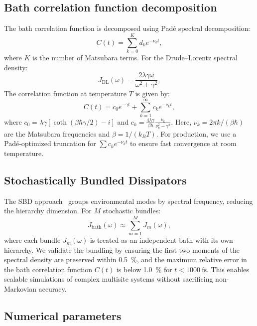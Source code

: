 \documentclass[11pt,a4paper]{article}
\begin{document}
\subsection{Bath correlation function decomposition}

The bath correlation function is decomposed using Padé spectral decomposition:
\begin{equation}
C(t) = \sum_{k=0}^{K} d_k e^{-\nu_k t},
\label{eq:SI_bath_correlation}
\end{equation}
where $K$ is the number of Matsubara terms. For the Drude--Lorentz spectral density:
\begin{equation}
J_{\mathrm{DL}}(\omega) = \frac{2\lambda\gamma\omega}{\omega^2 + \gamma^2},
\label{eq:SI_drude_lorentz}
\end{equation}
The correlation function at temperature $T$ is given by:
\begin{equation}
C(t) = c_0 e^{-\gamma t} + \sum_{k=1}^{\infty} c_k e^{-\nu_k t},
\label{eq:SI_correlation_DL}
\end{equation}
where $c_0 = \lambda\gamma[\coth(\beta\hbar\gamma/2) - i]$ and $c_k = \frac{4\lambda\gamma}{\beta\hbar} \frac{\nu_k}{\nu_k^2 - \gamma^2}$. Here, $\nu_k = 2\pi k/(\beta\hbar)$ are the Matsubara frequencies and $\beta = 1/(k_B T)$. For production, we use a Padé-optimized truncation for $\sum c_k e^{-\nu_k t}$ to ensure fast convergence at room temperature.

\subsection{Stochastically Bundled Dissipators}

The SBD approach~\cite{Varvelo2021a} groups environmental modes by spectral frequency, reducing the hierarchy dimension. For $M$ stochastic bundles:
\begin{equation}
J_{\mathrm{bath}}(\omega) \approx \sum_{m=1}^{M} J_m(\omega),
\label{eq:SI_sbd}
\end{equation}
where each bundle $J_m(\omega)$ is treated as an independent bath with its own hierarchy. We validate the bundling by ensuring the first two moments of the spectral density are preserved within \SI{0.5}{\percent}, and the maximum relative error in the bath correlation function $C(t)$ is below \SI{1.0}{\percent} for $t < \SI{1000}{\femto\second}$. This enables scalable simulations of complex multisite systems without sacrificing non-Markovian accuracy.

\subsection{Numerical parameters}
\end{document}

